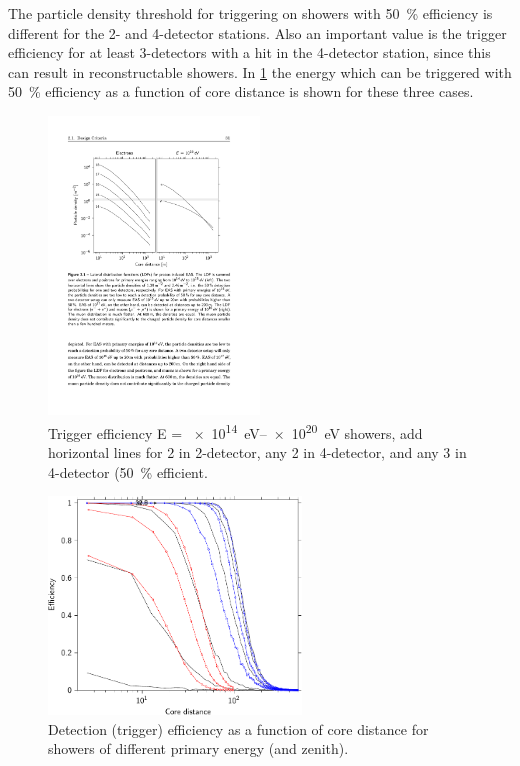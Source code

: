 The particle density threshold for triggering on showers with \SI{50}{\percent} efficiency is different for the 2- and 4-detector stations. Also an important value is the trigger efficiency for at least 3-detectors with a hit in the 4-detector station, since this can result in reconstructable showers. In \cref{fig:ldf_energies2} the energy which can be triggered with \SI{50}{\percent} efficiency as a function of core distance is shown for these three cases.

\begin{figure}
    \centering
    \includegraphics[width=0.5\textwidth]
                    {plots/station/ldf_energies}
    \caption{Trigger efficiency E = \SIrange{e14}{e20}{\eV} showers, add horizontal lines for 2 in 2-detector, any 2 in 4-detector, and any 3 in 4-detector (\SI{50}{\percent} efficient.}
    \label{fig:ldf_energies2}
\end{figure}

\begin{figure}
    \centering
    \includegraphics[width=0.6\textwidth]
                    {plots/station/efficiency_two_16}
    \caption{Detection (trigger) efficiency as a function of core distance for showers of different primary energy (and zenith).}
    \label{fig:efficiency_two_16}
\end{figure}

